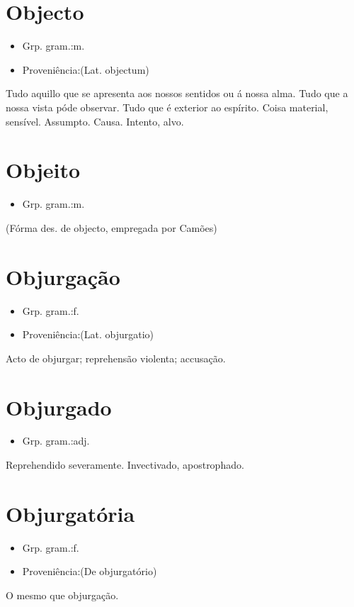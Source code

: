 \section{Objecto}
\begin{itemize}
\item {Grp. gram.:m.}
\end{itemize}
\begin{itemize}
\item {Proveniência:(Lat. \textunderscore objectum\textunderscore )}
\end{itemize}
Tudo aquillo que se apresenta aos nossos sentidos ou á nossa alma.
Tudo que a nossa vista póde observar.
Tudo que é exterior ao espírito.
Coisa material, sensível.
Assumpto.
Causa.
Intento, alvo.
\section{Objeito}
\begin{itemize}
\item {Grp. gram.:m.}
\end{itemize}
(Fórma des. de \textunderscore objecto\textunderscore , empregada por Camões)
\section{Objurgação}
\begin{itemize}
\item {Grp. gram.:f.}
\end{itemize}
\begin{itemize}
\item {Proveniência:(Lat. \textunderscore objurgatio\textunderscore )}
\end{itemize}
Acto de objurgar; reprehensão violenta; accusação.
\section{Objurgado}
\begin{itemize}
\item {Grp. gram.:adj.}
\end{itemize}
Reprehendido severamente.
Invectivado, apostrophado.
\section{Objurgatória}
\begin{itemize}
\item {Grp. gram.:f.}
\end{itemize}
\begin{itemize}
\item {Proveniência:(De \textunderscore objurgatório\textunderscore )}
\end{itemize}
O mesmo que \textunderscore objurgação\textunderscore .
